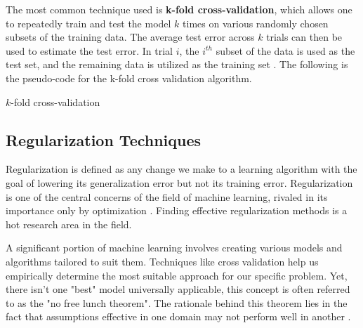 \documentclass{article}
\begin{document}
The most common technique used is \textbf{k-fold cross-validation}, which allows one to repeatedly train and test the model $k$ times on various randomly chosen subsets of the training data. The average test error across $k$ trials can then be used to estimate the test error. In trial $i$, the $i^{th}$ subset of the data is used as the test set, and the remaining data is utilized as the training set \citep{Goodfellow-et-al-2016}. The following is the pseudo-code for the k-fold cross validation algorithm.


\begin{algorithm}[h!]
  \caption{$k$-fold cross-validation}\label{k-CrossVal} 
\end{algorithm}

\subsection{Regularization Techniques}%
  \label{sub:Regularization Techniques}
Regularization is defined as any change we make to a
learning algorithm with the goal of lowering its generalization error but not its training error. Regularization is one of the central concerns of the field of machine
learning, rivaled in its importance only by optimization \citep{Goodfellow-et-al-2016}. Finding effective regularization methods is a hot research area in the field.

A significant portion of machine learning involves creating various models and algorithms tailored to suit them. Techniques like cross validation help us empirically determine the most suitable approach for our specific problem. Yet, there isn't one "best" model universally applicable, this concept is often referred to as the "no free lunch theorem". The rationale behind this theorem lies in the fact that assumptions effective in one domain may not perform well in another \citep{MurphyML}.
\end{document}
